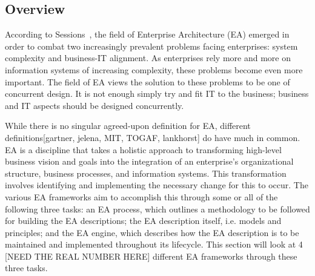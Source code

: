 




\subsection{Overview}
According to Sessions~\cite{sessions2007}, the field of Enterprise Architecture (EA) emerged in order to combat two increasingly prevalent problems facing enterprises: system complexity and business-IT alignment. As enterprises rely more and more on information systems of increasing complexity, these problems become even more important. The field of EA views the solution to these problems to be one of concurrent design. It is not enough simply try and fit IT to the business; business and IT aspects should be designed concurrently. 

While there is no singular agreed-upon definition for EA, different definitions[gartner, jelena, MIT, TOGAF, lankhorst] do have much in common. EA is a discipline that takes a holistic approach to transforming high-level business vision and goals into the integration of an enterprise's organizational structure, business processes, and information systems. This transformation involves identifying and implementing the necessary change for this to occur. The various EA frameworks aim to accomplish this through some or all of the following three tasks: an EA process, which outlines a methodology to be followed for building the EA descriptions; the EA description itself, i.e. models and principles; and the EA engine, which describes how the EA description is to be maintained and implemented throughout its lifecycle. This section will look at 4 [NEED THE REAL NUMBER HERE] different EA frameworks through these three tasks.

